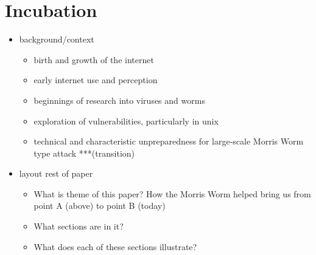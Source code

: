 \section*{Incubation}
\setcounter{page}{1}

\begin{itemize}
\item background/context
	\begin{itemize}
	\item birth and growth of the internet
    \item early internet use and perception
    \item beginnings of research into viruses and worms
    \item exploration of vulnerabilities, particularly in unix
    \item technical and characteristic unpreparedness for large-scale Morris Worm type attack ***(transition)
	\end{itemize}
\item layout rest of paper
	\begin{itemize}
	\item What is theme of this paper? How the Morris Worm helped bring us from point A (above) to point B (today)
	\item What sections are in it?
	\item What does each of these sections illustrate?
	\end{itemize}
\end{itemize}

